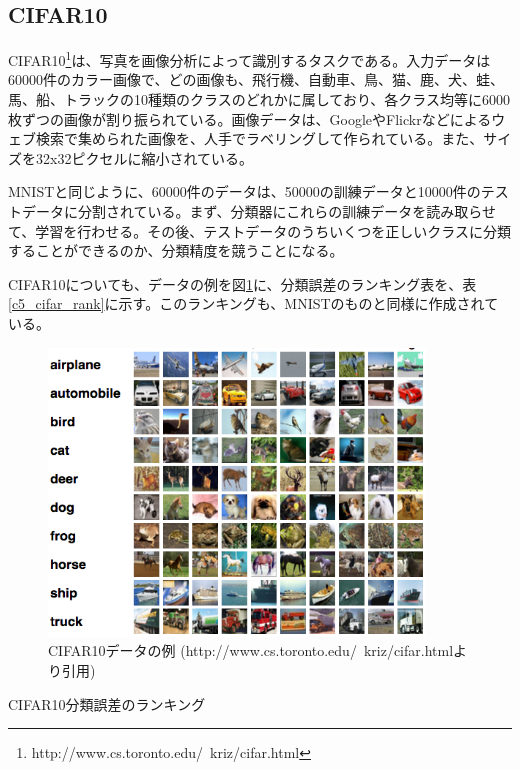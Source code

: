 \subsection{CIFAR10}
CIFAR10\footnote{http://www.cs.toronto.edu/~kriz/cifar.html}は、写真を画像分析によって識別するタスクである\cite{krizhevsky2009learning}。入力データは60000件のカラー画像で、どの画像も、飛行機、自動車、鳥、猫、鹿、犬、蛙、馬、船、トラックの10種類のクラスのどれかに属しており、各クラス均等に6000枚ずつの画像が割り振られている。画像データは、GoogleやFlickrなどによるウェブ検索で集められた画像を、人手でラベリングして作られている。また、サイズを32x32ピクセルに縮小されている。\par
MNISTと同じように、60000件のデータは、50000の訓練データと10000件のテストデータに分割されている。まず、分類器にこれらの訓練データを読み取らせて、学習を行わせる。その後、テストデータのうちいくつを正しいクラスに分類することができるのか、分類精度を競うことになる。\par
CIFAR10についても、データの例を図\ref{c5_cifar_ex}に、分類誤差のランキング表を、表\ref{c5_cifar_rank}に示す。このランキングも、MNISTのものと同様に作成されている。
\begin{figure}[tbp]
 \begin{center}
  \includegraphics[width=100mm]{img/c5/cifar_ex}
 \end{center}
 \caption{CIFAR10データの例 (http://www.cs.toronto.edu/~kriz/cifar.htmlより引用)}
 \label{c5_cifar_ex}
\end{figure}


\begin{table}[tbp]
 \begin{center}
  \caption{CIFAR10分類誤差のランキング}
 
 \end{center}

 \label{c5_cifar_rank}
\end{table}

